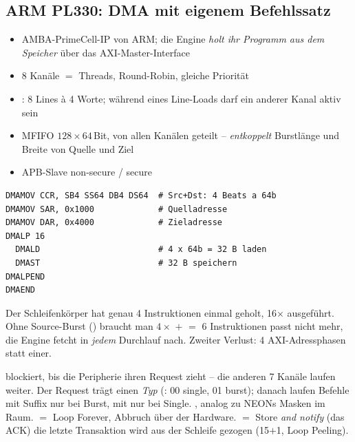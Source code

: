 \subsection{ARM PL330: DMA mit eigenem Befehlssatz}
\begin{itemize}
\item AMBA-PrimeCell-IP von ARM; die Engine \emph{holt ihr Programm aus
      dem Speicher} über das AXI-Master-Interface
\item 8 Kanäle $=$ Threads, Round-Robin, gleiche Priorität
\item {}: 8 Lines à 4 Worte; während eines Line-Loads
      darf ein anderer Kanal aktiv sein
\item MFIFO $128\times64$\,Bit, von allen Kanälen geteilt --
      \emph{entkoppelt} Burstlänge und Breite von Quelle und Ziel
\item APB-Slave non-secure  / secure 
\end{itemize}

\begin{lstlisting}
DMAMOV CCR, SB4 SS64 DB4 DS64  # Src+Dst: 4 Beats a 64b
DMAMOV SAR, 0x1000             # Quelladresse
DMAMOV DAR, 0x4000             # Zieladresse
DMALP 16
  DMALD                        # 4 x 64b = 32 B laden
  DMAST                        # 32 B speichern
DMALPEND
DMAEND
\end{lstlisting}

\begin{falle}
Der Schleifenkörper hat genau 4 Instruktionen \ra einmal geholt,
16$\times$ ausgeführt. Ohne Source-Burst () braucht man
$4\times$ $+$  $=$ 6 Instruktionen \ra passt nicht mehr,
die Engine fetcht in \emph{jedem} Durchlauf nach. Zweiter Verlust:
4 AXI-Adressphasen statt einer.\\
\end{falle}

  blockiert, bis die Peripherie ihren
Request zieht -- die anderen 7 Kanäle laufen weiter. Der Request trägt
einen \emph{Typ} (: 00 single, 01 burst); danach laufen Befehle
mit Suffix  nur bei Burst, mit  nur bei Single.
, analog zu NEONs Masken im Raum.
 $=$ Loop Forever, Abbruch über  der Hardware.
 $=$ Store \emph{and notify} (das ACK) \ra die letzte
Transaktion wird aus der Schleife gezogen (15$+$1, Loop Peeling).

